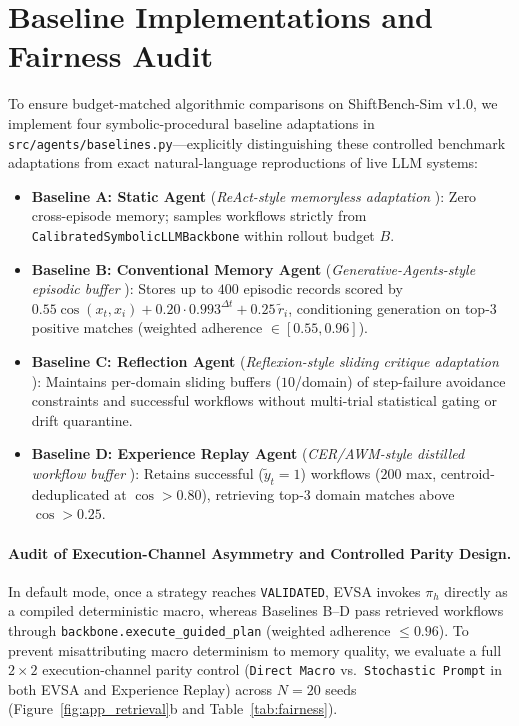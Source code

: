 \documentclass[10pt,letterpaper]{article}
\begin{document}
\section{Baseline Implementations and Fairness Audit}
\label{sec:baselines}
To ensure budget-matched algorithmic comparisons on ShiftBench-Sim v1.0, we implement four symbolic-procedural baseline adaptations in \texttt{src/agents/baselines.py}—explicitly distinguishing these controlled benchmark adaptations from exact natural-language reproductions of live LLM systems:
\begin{itemize}
  \item \textbf{Baseline A: Static Agent} (\emph{ReAct-style memoryless adaptation} \cite{yao2023react}): Zero cross-episode memory; samples workflows strictly from \texttt{CalibratedSymbolicLLMBackbone} within rollout budget $B$.
  \item \textbf{Baseline B: Conventional Memory Agent} (\emph{Generative-Agents-style episodic buffer} \cite{park2023generative}): Stores up to $400$ episodic records scored by $0.55\cos(x_t, x_i) + 0.20\cdot 0.993^{\Delta t} + 0.25\,\tilde{r}_i$, conditioning generation on top-$3$ positive matches (weighted adherence $\in [0.55, 0.96]$).
  \item \textbf{Baseline C: Reflection Agent} (\emph{Reflexion-style sliding critique adaptation} \cite{shinn2023reflexion}): Maintains per-domain sliding buffers ($10$/domain) of step-failure avoidance constraints and successful workflows without multi-trial statistical gating or drift quarantine.
  \item \textbf{Baseline D: Experience Replay Agent} (\emph{CER/AWM-style distilled workflow buffer} \cite{liu2025cer,wang2025awm}): Retains successful ($\tilde{y}_t=1$) workflows ($200$ max, centroid-deduplicated at $\cos > 0.80$), retrieving top-$3$ domain matches above $\cos > 0.25$.
\end{itemize}

\paragraph{Audit of Execution-Channel Asymmetry and Controlled Parity Design.}
In default mode, once a strategy reaches \texttt{VALIDATED}, EVSA invokes $\pi_h$ directly as a compiled deterministic macro, whereas Baselines B--D pass retrieved workflows through \texttt{backbone.execute\_guided\_plan} (weighted adherence $\le 0.96$). To prevent misattributing macro determinism to memory quality, we evaluate a full $2 \times 2$ execution-channel parity control (\texttt{Direct Macro} vs.\ \texttt{Stochastic Prompt} in both EVSA and Experience Replay) across $N=20$ seeds (Figure~\ref{fig:app_retrieval}b and Table~\ref{tab:fairness}).
\end{document}
